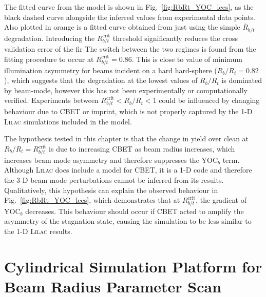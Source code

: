 The fitted curve from the model is shown in Fig.~\ref{fig:RbRt_YOC_lees}, as the black dashed curve alongside the inferred values from experimental data points.
Also plotted in orange is a fitted curve obtained from just using the simple $\overline{R}_{b/t}$ degradation.
Introducing the $R_{b/t}^{\text{crit}}$ threshold significantly reduces the cross validation error of the fir 
The switch between the two regimes is found from the fitting procedure to occur at $R_{b/t}^{\text{crit}}=0.86$.
This is close to value of minimum illumination asymmetry for beams incident on a hard hard-sphere ($R_b/R_t=0.82$), which suggests that the degradation at the lowest values of $R_b/R_t$ is dominated by beam-mode, however this has not been experimentally or computationally verified.
Experiments between $R_{b/t}^{\text{crit}} < R_b/R_t < 1$ could be influenced by changing behaviour due to \ac{CBET} or imprint, which is not properly captured by the 1-D \textsc{Lilac} simulations included in the model.

The hypothesis tested in this chapter is that the change in yield over clean at $R_b/R_t = R_{b/t}^{\text{crit}}$ is due to increasing \ac{CBET} as beam radius increases, which increases beam mode asymmetry and therefore suppresses the $\text{YOC}_{b}$ term.
Although \textsc{Lilac} does include a model for \ac{CBET}, it is a 1-D code and therefore the 3-D beam mode perturbations cannot be inferred from its results.
Qualitatively, this hypothesis can explain the observed behaviour in Fig.~\ref{fig:RbRt_YOC_lees}, which demonstrates that at $R_{b/t}^{\text{crit}}$, the gradient of $\text{YOC}_{b}$ decreases.
This behaviour should occur if \ac{CBET} acted to amplify the asymmetry of the stagnation state, causing the simulation to be less similar to the 1-D \textsc{Lilac} results.

\section{Cylindrical Simulation Platform for Beam Radius Parameter Scan}%
\label{sec:Res1_CylRbRt_platform}


